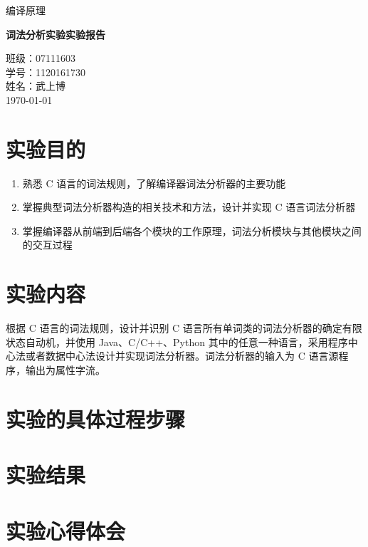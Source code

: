 \documentclass[UTF8]{ctexart}
\begin{document}
\begin{titlepage}
  \begin{center}
    \vspace*{1cm}

    \Large
    编译原理

    \vspace{0.5cm}
    \Huge
    \textbf{词法分析实验实验报告}

    \vfill

    \normalsize\kaishu
    班级：07111603 \\
    学号：1120161730 \\
    姓名：武上博 \\
    \today
    \vspace{1cm}
  \end{center}
\end{titlepage}

\tableofcontents
\newpage

\section{实验目的}
\begin{enumerate}
  \item 熟悉 C 语言的词法规则，了解编译器词法分析器的主要功能
  \item 掌握典型词法分析器构造的相关技术和方法，设计并实现 C 语言词法分析器
  \item 掌握编译器从前端到后端各个模块的工作原理，词法分析模块与其他模块之间的交互过程
\end{enumerate}

\section{实验内容}
根据 C 语言的词法规则，设计并识别 C 语言所有单词类的词法分析器的确定有限状态自动机，并使用 Java、C/C++、Python 其中的任意一种语言，采用程序中心法或者数据中心法设计并实现词法分析器。词法分析器的输入为 C 语言源程序，输出为属性字流。

\section{实验的具体过程步骤}

\section{实验结果}

\section{实验心得体会}
\end{document}
